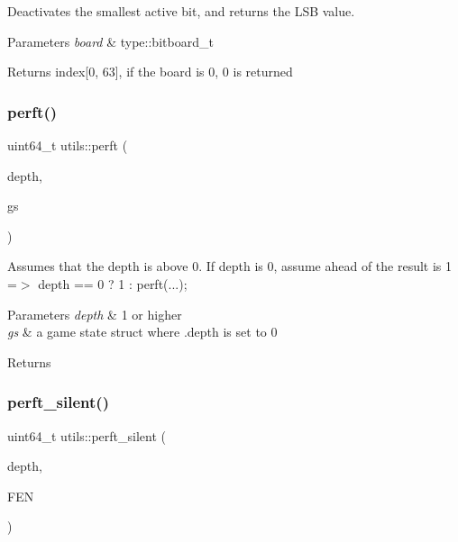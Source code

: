 Deactivates the smallest active bit, and returns the L\+SB value.


\begin{DoxyParams}{Parameters}
{\em board} & type\+::bitboard\+\_\+t \\
\hline
\end{DoxyParams}
\begin{DoxyReturn}{Returns}
index\mbox{[}0, 63\mbox{]}, if the board is 0, 0 is returned 
\end{DoxyReturn}
\mbox{\label{namespaceutils_adb012fdcadbd0fefac13b72dcb638f9d}} 
\subsubsection{\texorpdfstring{perft()}{perft()}}
{\footnotesize\ttfamily uint64\+\_\+t utils\+::perft (\begin{DoxyParamCaption}\item[{const uint8\+\_\+t}]{depth,  }\item[{\+::\hyperlink{structdavid_1_1bitboard_1_1gameState}{david\+::type\+::game\+State\+\_\+t} \&}]{gs }\end{DoxyParamCaption})}

Assumes that the depth is above 0. If depth is 0, assume ahead of the result is 1 =$>$ depth == 0 ? 1 \+: perft(...);


\begin{DoxyParams}{Parameters}
{\em depth} & 1 or higher \\
\hline
{\em gs} & a game state struct where .depth is set to 0 \\
\hline
\end{DoxyParams}
\begin{DoxyReturn}{Returns}

\end{DoxyReturn}
\mbox{\label{namespaceutils_abcc8166e9f81cb4000d77b797f0d4c38}} 
\subsubsection{\texorpdfstring{perft\+\_\+silent()}{perft\_silent()}}
{\footnotesize\ttfamily uint64\+\_\+t utils\+::perft\+\_\+silent (\begin{DoxyParamCaption}\item[{const uint\+\_\+fast8\+\_\+t}]{depth,  }\item[{const std\+::string}]{F\+EN }\end{DoxyParamCaption})}

